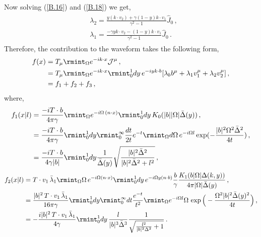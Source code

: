 Now solving (\ref{B.16}) and (\ref{B.18}) we get,
\begin{align}
    \begin{split}
      &  \lambda_2=\frac{y(k\cdot v_2)+\gamma (1-y)k\cdot v_1}{\gamma^2-1}\hat{J}_0\,,\\ &
      \lambda_1=\frac{-\gamma y k\cdot v_2-(1-y)k\cdot v_1}{\gamma^2-1}\hat{J}_0\,.
    \end{split}
\end{align}
Therefore, the contribution to the waveform takes the following form,
\begin{align}
   \begin{split}
       f(x)&=T_{\mu}\rmint_{\Omega}e^{-ik\cdot x}\mathcal{J}^{\mu}\,,\\ &
=T_{\mu}\rmint_{\Omega}e^{-ik\cdot x}\rmint_0^1dy\, e^{-iyk\cdot b}[\lambda_b b^\mu+\lambda_1 v_1^\mu+\lambda_2 v_2^\mu]\,,\\ &
=f_1+f_2+f_3\,,\label{A.19 m}
   \end{split}
\end{align}
where, 
\begin{align}
    \begin{split}
        f_1(x|l)&=\frac{-iT\cdot b}{4\pi \gamma}\rmint_{\Omega}e^{-i\Omega\,(n\cdot x)}\rmint_{0}^1dy\,K_0(|b||\Omega|\bar\Delta(y))\,,\\ &
        =\frac{-iT\cdot b}{4\pi \gamma}\rmint_{0}^1 dy\rmint_{0}^\infty \frac{dt}{2t}e^{-t}\rmint_{\Omega}d\Omega\,e^{-i\Omega l}\exp(-\frac{|b|^2\Omega^2\bar\Delta^2}{4t})\,,\\ &
       =\frac{-iT\cdot b}{4 \gamma |b|}\rmint_{0}^1 dy\frac{1}{\bar\Delta(y)}\sqrt{\frac{|b|^2\bar\Delta^2}{|b|^2\bar\Delta^2+l^2}}\,,
    \end{split}
\end{align}
\begin{align}
    \begin{split}
        f_2(x|l)&=T\cdot v_1\, \bar\lambda_1\rmint_{\Omega}\Omega\, e^{-i\Omega (n\cdot x)}\rmint_0^1 dy\,e^{-i\Omega y(n\cdot b)}\frac{b}{\gamma}\frac{K_{1}(b|\Omega|\Delta(k,y))}{4\pi |\Omega|\bar\Delta(y)}\,,\\ &
        =\frac{|b|^2\, T\cdot v_1\, \bar\lambda_1}{16\pi\gamma}\rmint_0^1 dy\rmint_{0}^\infty dt\frac{e^{-t}}{t^2}\rmint_{\Omega} e^{-i\Omega l}\Omega \,\exp\Big(-\frac{\Omega^2 |b|^2 \bar\Delta(y)^2}{4t}\Big)\,,\\ &
        =-\frac{i |b|^2\, T\cdot v_1\, \bar\lambda_1}{4\gamma}\rmint_0^1 dy\, \frac{l}{|b|^3 \bar\Delta^3}\frac{1}{\sqrt{\frac{l^2}{|b|^2 \Delta ^2}+1}}\,.
    \end{split}
\end{align}
